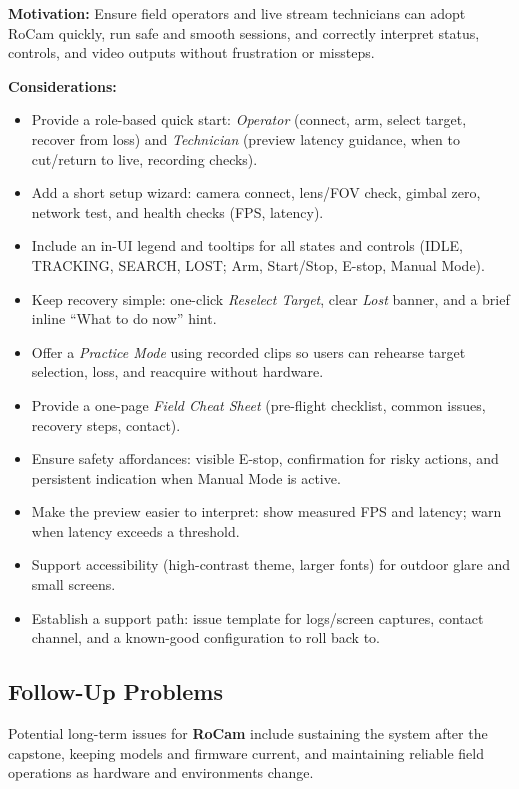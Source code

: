 \documentclass[12pt]{article}
\begin{document}
\textbf{Motivation:} Ensure field operators and live stream technicians can adopt RoCam quickly, run safe and smooth sessions, and correctly interpret status, controls, and video outputs without frustration or missteps.

\textbf{Considerations:}
\begin{itemize}
  \item Provide a role-based quick start: \emph{Operator} (connect, arm, select target, recover from loss) and \emph{Technician} (preview latency guidance, when to cut/return to live, recording checks).
  \item Add a short setup wizard: camera connect, lens/FOV check, gimbal zero, network test, and health checks (FPS, latency).
  \item Include an in-UI legend and tooltips for all states and controls (IDLE, TRACKING, SEARCH, LOST; Arm, Start/Stop, E-stop, Manual Mode).
  \item Keep recovery simple: one-click \emph{Reselect Target}, clear \emph{Lost} banner, and a brief inline “What to do now” hint.
  \item Offer a \emph{Practice Mode} using recorded clips so users can rehearse target selection, loss, and reacquire without hardware.
  \item Provide a one-page \emph{Field Cheat Sheet} (pre-flight checklist, common issues, recovery steps, contact).
  \item Ensure safety affordances: visible E-stop, confirmation for risky actions, and persistent indication when Manual Mode is active.
  \item Make the preview easier to interpret: show measured FPS and latency; warn when latency exceeds a threshold.
  \item Support accessibility (high-contrast theme, larger fonts) for outdoor glare and small screens.
  \item Establish a support path: issue template for logs/screen captures, contact channel, and a known-good configuration to roll back to.
\end{itemize}



\subsection{Follow-Up Problems}

Potential long-term issues for \textbf{RoCam} include sustaining the system after the capstone, keeping models and firmware current, and maintaining reliable field operations as hardware and environments change.
\end{document}
